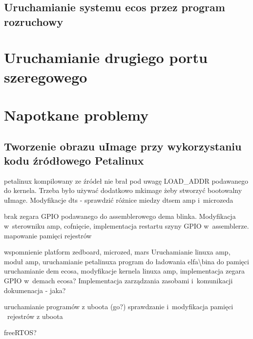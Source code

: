 \subsection{Uruchamianie systemu ecos przez program rozruchowy} 
\label{ssub:uruchamianie_systemu_przez_program_rozruchowy}






\section{Uruchamianie drugiego portu szeregowego} 
\label{sec:uruchamianie_drugiego_portu_szeregowego}



\section{Napotkane problemy} 
\label{sec:napotkane_problemy}

\subsection{Tworzenie obrazu uImage przy wykorzystaniu kodu źródłowego Petalinux}
\label{ssub:tworzenie_obrazu_uimage_przy_wykorzystaniu_kodu_r_d_owego_petalinux}

petalinux kompilowany ze źródeł nie brał pod uwagę LOAD\_ADDR podawanego do kernela. Trzeba było używać dodatkowo mkimage żeby stworzyć bootowalny uImage.
Modyfikacje dts - sprawdzić różnice miedzy dtsem amp i~microzeda




brak zegara GPIO podawanego do assemblerowego dema blinka. Modyfikacja w~sterowniku amp, cofnięcie, implementacja restartu szyny GPIO w~assemblerze.
mapowanie pamięci rejestrów



wspomnienie platform zedboard, microzed, mars
Uruchamianie linuxa amp, moduł amp, 
uruchamianie petalinuxa
program do ładowania elfa\textbackslash bina do pamięci
uruchamianie dem ecosa, modyfikacje kernela linuxa amp, implementacja zegara GPIO w~demach ecosa?
Implementacja zarządzania zasobami i~komunikacji
dokumenacja - jaka?



uruchamianie programów z uboota (go?)
sprawdzanie i~modyfikacja pamięci \ rejestrów z uboota

freeRTOS?



